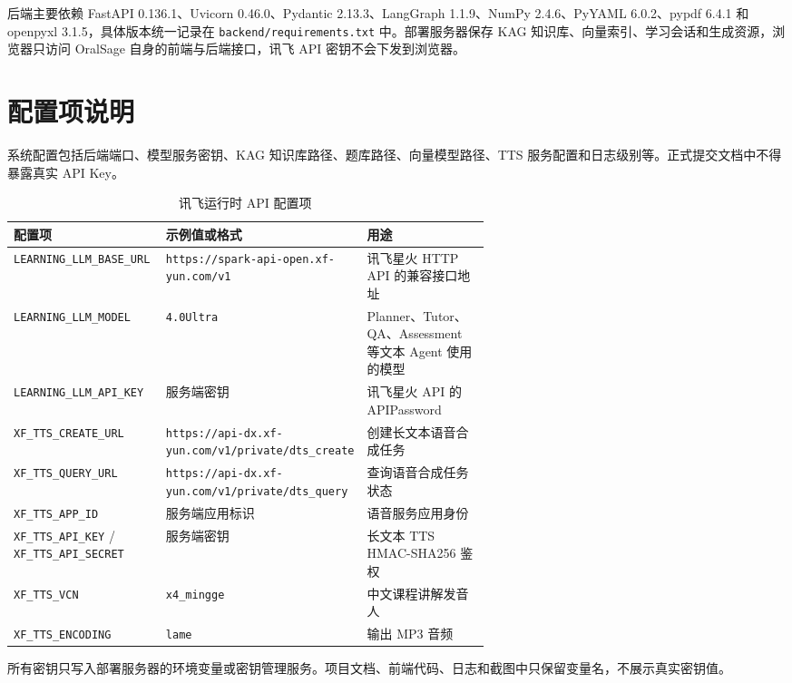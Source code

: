 后端主要依赖 FastAPI 0.136.1、Uvicorn 0.46.0、Pydantic 2.13.3、LangGraph 1.1.9、NumPy 2.4.6、PyYAML 6.0.2、pypdf 6.4.1 和 openpyxl 3.1.5，具体版本统一记录在 \texttt{backend/requirements.txt} 中。部署服务器保存 KAG 知识库、向量索引、学习会话和生成资源，浏览器只访问 OralSage 自身的前端与后端接口，讯飞 API 密钥不会下发到浏览器。

\section{配置项说明}

系统配置包括后端端口、模型服务密钥、KAG 知识库路径、题库路径、向量模型路径、TTS 服务配置和日志级别等。正式提交文档中不得暴露真实 API Key。

\begin{table}[H]
  \centering
  \caption{讯飞运行时 API 配置项}
  \label{tab:xfyun-deployment-config}
  \begin{tabularx}{\linewidth}{p{0.32\linewidth}p{0.29\linewidth}X}
    \toprule
    配置项 & 示例值或格式 & 用途 \\
    \midrule
    \texttt{LEARNING\_LLM\_BASE\_URL} & \texttt{https://spark-api-open.xf-yun.com/v1} & 讯飞星火 HTTP API 的兼容接口地址 \\
    \texttt{LEARNING\_LLM\_MODEL} & \texttt{4.0Ultra} & Planner、Tutor、QA、Assessment 等文本 Agent 使用的模型 \\
    \texttt{LEARNING\_LLM\_API\_KEY} & 服务端密钥 & 讯飞星火 API 的 APIPassword \\
    \texttt{XF\_TTS\_CREATE\_URL} & \texttt{https://api-dx.xf-yun.com/v1/private/dts\_create} & 创建长文本语音合成任务 \\
    \texttt{XF\_TTS\_QUERY\_URL} & \texttt{https://api-dx.xf-yun.com/v1/private/dts\_query} & 查询语音合成任务状态 \\
    \texttt{XF\_TTS\_APP\_ID} & 服务端应用标识 & 语音服务应用身份 \\
    \texttt{XF\_TTS\_API\_KEY} / \texttt{XF\_TTS\_API\_SECRET} & 服务端密钥 & 长文本 TTS HMAC-SHA256 鉴权 \\
    \texttt{XF\_TTS\_VCN} & \texttt{x4\_mingge} & 中文课程讲解发音人 \\
    \texttt{XF\_TTS\_ENCODING} & \texttt{lame} & 输出 MP3 音频 \\
    \bottomrule
  \end{tabularx}
\end{table}

所有密钥只写入部署服务器的环境变量或密钥管理服务。项目文档、前端代码、日志和截图中只保留变量名，不展示真实密钥值。

